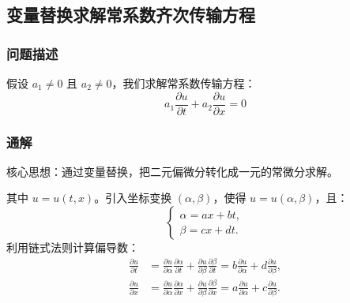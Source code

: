 \documentclass[12pt,a4paper]{article}
\numberwithin{subsection}{section}   %
\numberwithin{subsubsection}{subsection}
\theoremstyle{plain}
\theoremstyle{definition}
\theoremstyle{remark}
\theoremstyle{remark}
\begin{document}
	\subsection{变量替换求解常系数齐次传输方程} 
	\subsubsection{问题描述}
	
	
	假设 $a_1 \neq 0$ 且 $a_2 \neq 0$，我们求解常系数传输方程：
	\begin{equation} \label{eq:pde_original}
		a_1 \frac{\partial u}{\partial t} + a_2 \frac{\partial u}{\partial x} = 0
	\end{equation}
	
	\subsubsection{通解} 
	核心思想：通过变量替换，把二元偏微分转化成一元的常微分求解。
	
	其中 $u = u(t,x)$。引入坐标变换 $(\alpha, \beta)$，使得 $u = u(\alpha, \beta)$，且：
	\begin{equation} \label{eq:coordinate_transform}
		\begin{cases}
			\alpha = ax + bt, \\
			\beta = cx + dt.
		\end{cases}
	\end{equation}
	利用链式法则计算偏导数：
	\begin{align}
		\frac{\partial u}{\partial t} 
		&= \frac{\partial u}{\partial \alpha} \frac{\partial \alpha}{\partial t} + \frac{\partial u}{\partial \beta} \frac{\partial \beta}{\partial t} 
		= b\frac{\partial u}{\partial \alpha} + d\frac{\partial u}{\partial \beta}, \label{eq:u_t_chain_rule} \\
		\frac{\partial u}{\partial x} 
		&= \frac{\partial u}{\partial \alpha} \frac{\partial \alpha}{\partial x} + \frac{\partial u}{\partial \beta} \frac{\partial \beta}{\partial x} 
		= a\frac{\partial u}{\partial \alpha} + c\frac{\partial u}{\partial \beta}. \label{eq:u_x_chain_rule}
	\end{align}
	
\end{document}
